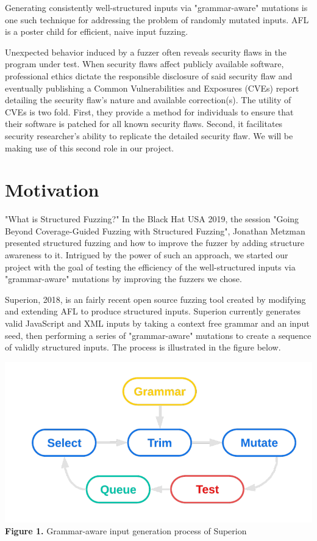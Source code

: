 \documentclass[12pt]{diazessay}
\begin{document}
Generating consistently well-structured inputs\cite{structuredInput} via "grammar-aware" mutations is one such technique for addressing the problem of randomly mutated inputs.
AFL is a poster child for efficient, naive input fuzzing.

Unexpected behavior induced by a fuzzer often reveals security flaws in the program under test.
When security flaws affect publicly available software, professional ethics dictate the responsible disclosure of said security flaw and eventually publishing a Common Vulnerabilities and Exposures (CVEs) \cite{mell2002use} report detailing the security flaw's nature and available correction(s).
The utility of CVEs is two fold.
First, they provide a method for individuals to ensure that their software is patched for all known security flaws.
Second, it facilitates security researcher's ability to replicate the detailed security flaw.
We will be making use of this second role in our project.


\section*{Motivation}
\label{Motivation}

"What is Structured Fuzzing?" In the Black Hat USA 2019\cite{blackhat2019}, the session "Going Beyond Coverage-Guided Fuzzing with Structured Fuzzing", Jonathan Metzman presented structured fuzzing and how to improve the fuzzer by adding structure awareness to it. 
Intrigued by the power of such an approach, we started our project with the goal of testing the efficiency of the well-structured inputs via "grammar-aware" mutations by improving the fuzzers we chose.

Superion\cite{superion}, 2018, is an fairly recent open source fuzzing tool created by modifying and extending AFL to produce structured inputs.
Superion currently generates valid JavaScript and XML inputs by taking a context free grammar and an input seed, then performing a series of "grammar-aware" mutations to create a sequence of validly structured inputs. The process is illustrated in the figure below.

\begin{center}
	\includegraphics[scale=0.4, trim={0 1cm 0 0}, clip]{superionfig.png}\\
	\textbf{Figure 1.} Grammar-aware input generation process of Superion
\end{center}
\vspace{3mm}
\end{document}

